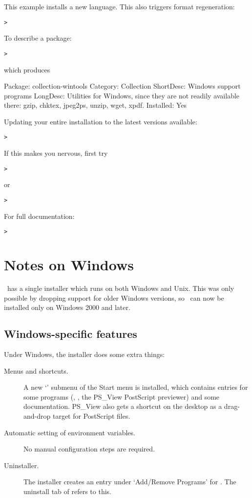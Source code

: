 \documentclass{article}
\begin{document}
This example installs a new language.  This also triggers format
regeneration:
\begin{alltt}
> 
\end{alltt}
To describe a package:
\begin{alltt}
> 
\end{alltt}
which produces
\begin{fverbatim}
Package:   collection-wintools
Category:  Collection
ShortDesc: Windows support programs
LongDesc:  Utilities for Windows, since they are not readily available there:
 gzip, chktex, jpeg2ps, unzip, wget, xpdf.
Installed: Yes
\end{fverbatim}
Updating your entire installation to the latest versions available:
\begin{alltt}
> 
\end{alltt}
If this makes you nervous, first try
\begin{alltt}
> 
\end{alltt}
or
\begin{alltt}
> 
\end{alltt}
For full documentation:
\begin{alltt}
> 
\end{alltt}


\section{Notes on Windows}
\label{sec:windows}

\TL\ has a single installer which runs on both Windows and Unix.  This
was only possible by dropping support for older Windows versions, so
\TL\ can now be installed only on Windows 2000 and later.


\subsection{Windows-specific features}
\label{sec:winfeatures}

Under Windows, the installer does some extra things:
\begin{description}
\item[Menus and shortcuts.] A new `\TL{}' submenu of the
  Start menu is installed, which contains entries for some \GUI{} programs
  (, , the PS\_View PostScript previewer)
  and some documentation. PS\_View also gets a shortcut on the
  desktop as a drag-and-drop target for PostScript files.
\item[Automatic setting of environment variables.] No manual
  configuration steps are required.
\item[Uninstaller.] The installer creates an entry under `Add/Remove
  Programs' for \TL. The uninstall tab of refers to
  this.
\end{description}
\end{document}
